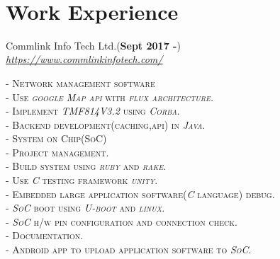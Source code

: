 \documentclass[10pt]{article} %
\newcommand\tab[1][1cm]{\hspace*{#1}}
\begin{document}
\color{text1} %


\par{\\ %



\begin{minipage}[t]{0.5\textwidth} %
\vspace{0pt} %
	

\section{Work Experience} 


{{\raggedright\large Commlink Info Tech Ltd.(\textbf{Sept 2017 -}) \\
\textit{\href {https://www.commlinkinfotech.com/}{https://www.commlinkinfotech.com/}}\\
}}
	 \textsc{- Network management software}\\
	 	\tab \textsc{- Use \textit{google Map api} with \textit{flux architecture.}}\\
	 	\tab \textsc{- Implement \textit{TMF814V3.2} using \textit{Corba}.}\\
	 	\tab \textsc{- Backend development(caching,api) in \textit{Java}.}\\
	 \textsc{- System on Chip(SoC) }\\
	 	\tab \textsc{- Project management.}\\
	 	\tab \textsc{- Build system using \textit{ruby} and \textit{rake}.}\\
	 	\tab \textsc{- Use \textit{C} testing framework \textit{unity}.}\\
	 	\tab \textsc{- Embedded large application software(\textit{C} language) debug.}\\
	 	\tab \textsc{- \textit{SoC} boot using \textit{U-boot} and \textit{linux}.}\\
	 	\tab \textsc{- \textit{SoC} h/w pin configuration and connection check.}\\
	 	\tab \textsc{- Documentation.}\\
	 	\tab \textsc{- Android app to upload application software to \textit{SoC}.}\\



\end{minipage}}
\end{document}
